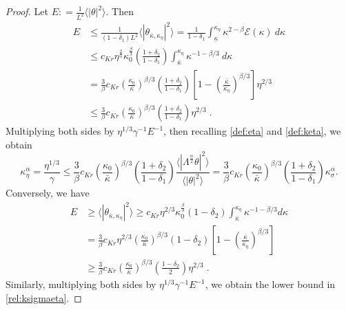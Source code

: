 \documentclass[twoside, reqno]{amsart}
\numberwithin{lemma}{section}
\numberwithin{theorem}{section}
\numberwithin{proposition}{section}
\numberwithin{equation}{section} %
\newcommand{\te}{\theta}
\newcommand{\ga}{\gamma}
\newcommand{\la}{\Lambda}
\newcommand{\ka}{\kappa}
\newcommand{\kbar}{\overline{\ka}}
\newcommand{\kapb}{\underline{\kap}}
\newcommand{\Ecal}{\mathcal{E}}
\newcommand{\al}{\alpha}
\newcommand{\be}{\beta}
\newcommand{\de}{\delta}
\newcommand{\kap}{\kappa}
\begin{document}
\begin{proof}
{Let $E: = \frac{1}{L^2} \langle|\te|^2\rangle$. Then}
\begin{align*}
    E & {\le} \frac{1}{(1-\delta_1)L^2} \langle|\te_{\kbar,\ka_\eta}|^2\rangle = {\frac{1}{1-\de_1}\int_{\kapb}^{\kap_\eta}\kap^{2-\be}\Ecal(\kap)\ d\kap}
    \\
    &{\le}  c_{Kr} \eta ^{\frac{2}{3}} \ka_0^{\frac{\beta}{3}} \left(\frac{1+\delta_2}{1-\delta_1}\right) \int_{\bar{\ka}}^{\ka_\eta} \ka^{-1 - \beta/3}\ {d\kap}  \\
    & = \frac{3}{\beta} c_{Kr} \left( \frac{\ka_0}{\bar{\ka}}\right)^{\beta/3} \left(\frac{1+\delta_2}{1-\delta_1}\right) \left[ 1 - \left(\frac{\bar{\ka}}{\ka_\eta}\right)^{\beta/3}\right] \eta ^{2/3} \\
    & \le \frac{3}{\beta} c_{Kr} \left( \frac{\ka_0}{\bar{\ka}}\right)^{\beta/3} \left(\frac{1+\delta_2}{1-\delta_1}\right) \eta ^{2/3}\;.
\end{align*}
    Multiplying both sides by $\eta^{1/3}\ga^{-1} E^{-1}$, {then recalling \eqref{def:eta} and \eqref{def:keta}}, we obtain
    \begin{equation*}
        \ka_{\eta}^{\alpha} = \frac{\eta^{1/3}}{\ga} 
        \le \frac{{3}}{\beta} c_{Kr} \left( \frac{\ka_0}{\bar{\ka}}\right)^{\beta/3} \left(\frac{1+\delta_2}{1-\delta_1}\right)  \frac{\langle|\la^{\frac{\alpha}{2}}\te|^2\rangle}{\langle|\te|^2\rangle} =  \frac{3}{\beta} c_{Kr} \left( \frac{\ka_0}{\bar{\ka}}\right)^{\beta/3} \left(\frac{1+\delta_2}{1-\delta_1}\right) \ka_\sigma^{\al} .
    \end{equation*}
Conversely, we have
    \begin{align*}
        E &\ge \langle|\te_{\kbar,\ka_\eta}|^2\rangle 
        {\ge} c_{Kr} \eta ^{2/3} \ka_0^{\frac{\beta}{3}} (1 - \delta_2) \int_{\bar{\ka}}^{\ka_\eta} \ka^{-1 - \beta/3} d\ka \\
        & = \frac{3}{\beta} c_{Kr} \eta ^{2/3} \left( \frac{\ka_0}{\bar{\ka}}\right)^{\beta/3} (1 - \delta_2) \left[ 1 -  \left(\frac{\bar{\ka}}{\ka_\eta}\right)^{\beta/3}\right]  \\
        & {\ge} \frac{3}{\beta} c_{Kr}  \left( \frac{\ka_0}{\bar{\ka}}\right)^{\beta/3} \left(\frac{1-\delta_2}{2}\right) \eta ^{2/3} \;.
    \end{align*}
Similarly, multiplying both sides by $\eta^{1/3}\ga^{-1} E^{-1}$, we obtain the lower bound in \eqref{rel:ksigmaeta}.

\end{proof}
\end{document}
